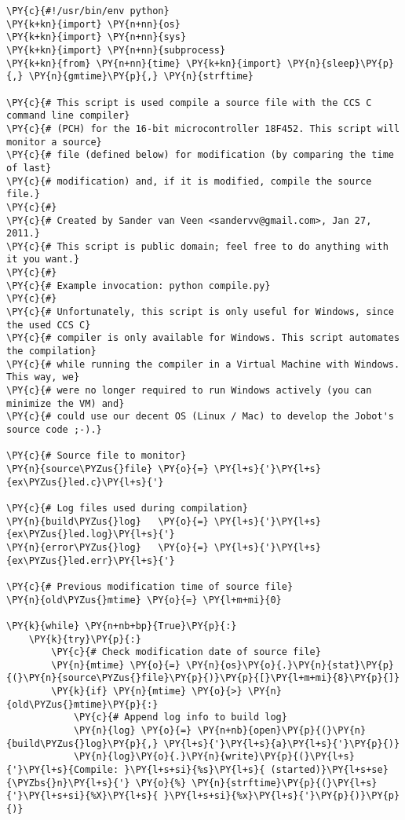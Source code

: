 \begin{Verbatim}[commandchars=\\\{\}]
\PY{c}{#!/usr/bin/env python}
\PY{k+kn}{import} \PY{n+nn}{os}
\PY{k+kn}{import} \PY{n+nn}{sys}
\PY{k+kn}{import} \PY{n+nn}{subprocess}
\PY{k+kn}{from} \PY{n+nn}{time} \PY{k+kn}{import} \PY{n}{sleep}\PY{p}{,} \PY{n}{gmtime}\PY{p}{,} \PY{n}{strftime}

\PY{c}{# This script is used compile a source file with the CCS C command line compiler}
\PY{c}{# (PCH) for the 16-bit microcontroller 18F452. This script will monitor a source}
\PY{c}{# file (defined below) for modification (by comparing the time of last}
\PY{c}{# modification) and, if it is modified, compile the source file.}
\PY{c}{#}
\PY{c}{# Created by Sander van Veen <sandervv@gmail.com>, Jan 27, 2011.}
\PY{c}{# This script is public domain; feel free to do anything with it you want.}
\PY{c}{#}
\PY{c}{# Example invocation: python compile.py}
\PY{c}{#}
\PY{c}{# Unfortunately, this script is only useful for Windows, since the used CCS C}
\PY{c}{# compiler is only available for Windows. This script automates the compilation}
\PY{c}{# while running the compiler in a Virtual Machine with Windows. This way, we}
\PY{c}{# were no longer required to run Windows actively (you can minimize the VM) and}
\PY{c}{# could use our decent OS (Linux / Mac) to develop the Jobot's source code ;-).}

\PY{c}{# Source file to monitor}
\PY{n}{source\PYZus{}file} \PY{o}{=} \PY{l+s}{'}\PY{l+s}{ex\PYZus{}led.c}\PY{l+s}{'}

\PY{c}{# Log files used during compilation}
\PY{n}{build\PYZus{}log}   \PY{o}{=} \PY{l+s}{'}\PY{l+s}{ex\PYZus{}led.log}\PY{l+s}{'}
\PY{n}{error\PYZus{}log}   \PY{o}{=} \PY{l+s}{'}\PY{l+s}{ex\PYZus{}led.err}\PY{l+s}{'}

\PY{c}{# Previous modification time of source file}
\PY{n}{old\PYZus{}mtime} \PY{o}{=} \PY{l+m+mi}{0}

\PY{k}{while} \PY{n+nb+bp}{True}\PY{p}{:}
    \PY{k}{try}\PY{p}{:}
        \PY{c}{# Check modification date of source file}
        \PY{n}{mtime} \PY{o}{=} \PY{n}{os}\PY{o}{.}\PY{n}{stat}\PY{p}{(}\PY{n}{source\PYZus{}file}\PY{p}{)}\PY{p}{[}\PY{l+m+mi}{8}\PY{p}{]}
        \PY{k}{if} \PY{n}{mtime} \PY{o}{>} \PY{n}{old\PYZus{}mtime}\PY{p}{:}
            \PY{c}{# Append log info to build log}
            \PY{n}{log} \PY{o}{=} \PY{n+nb}{open}\PY{p}{(}\PY{n}{build\PYZus{}log}\PY{p}{,} \PY{l+s}{'}\PY{l+s}{a}\PY{l+s}{'}\PY{p}{)}
            \PY{n}{log}\PY{o}{.}\PY{n}{write}\PY{p}{(}\PY{l+s}{'}\PY{l+s}{Compile: }\PY{l+s+si}{%s}\PY{l+s}{ (started)}\PY{l+s+se}{\PYZbs{}n}\PY{l+s}{'} \PY{o}{%} \PY{n}{strftime}\PY{p}{(}\PY{l+s}{'}\PY{l+s+si}{%X}\PY{l+s}{ }\PY{l+s+si}{%x}\PY{l+s}{'}\PY{p}{)}\PY{p}{)}


\end{Verbatim}
